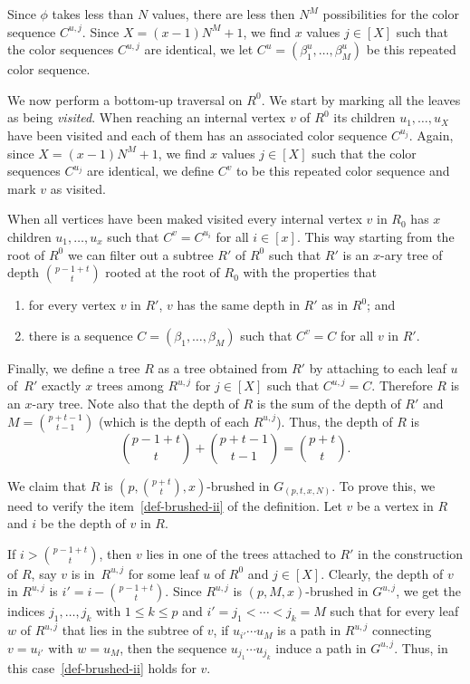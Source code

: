 Since $\phi$ takes less than $N$ values, there are less then $N^{M}$ possibilities for
the color sequence $C^{u,j}$.
Since $X = (x-1)N^{M}+1$, we find $x$ values $j\in [X]$ such that the
color sequences $C^{u,j}$ are identical, we let
$C^{u}=\left(\beta^u_1,\ldots,\beta^u_{M}\right)$ be this repeated color sequence.

We now perform a bottom-up traversal on  $R^{0}$.
We start by marking all the leaves as being \emph{visited}.
When reaching an internal vertex $v$ of $R^{0}$ its children
$u_1,\ldots,u_X$ have been visited and each of them has an
associated color sequence $C^{u_j}$. Again, since $X = (x-1)N^{M}+1$,
we find $x$ values $j\in [X]$ such that the
color sequences $C^{u_j}$ are identical, we define
$C^{v}$ to be this repeated color sequence and mark
$v$ as visited.

When all vertices have been maked visited every internal vertex $v$ in $R_0$
has $x$ children $u_1,\ldots,u_x$ such that $C^v=C^{u_i}$ for all $i\in[x]$.
This way starting from the root of $R^0$ we can filter out a subtree $R'$
of $R^0$ such that $R'$ is an $x$-ary tree of depth $\binom{p-1+t}{t}$
rooted at the root of $R_0$ with the properties that
\begin{enumerate}[label=\textup{(\roman*)},nosep]
\item for every vertex $v$ in $R'$, $v$ has the same depth in $R'$ as in $R^0$; and
\item there is a sequence $C=(\beta_1,\ldots,\beta_M)$ such that $C^v=C$ for all $v$ in $R'$.
\end{enumerate}

Finally, we define a tree $R$ as a tree obtained from $R'$ by attaching to
each leaf $u$ of~$R'$ exactly $x$ trees among $R^{u,j}$ for $j\in[X]$ such
that $C^{u,j}=C$.  Therefore $R$ is an $x$-ary tree.  Note also that the
depth of $R$ is the sum of the depth of $R'$ and $M=\binom{p+t-1}{t-1}$
(which is the depth of each $R^{u,j}$).  Thus, the depth of $R$ is
\[
\binom{p-1+t}{t} + \binom{p+t-1}{t-1} = \binom{p+t}{t}.
\]

We claim that $R$ is $\left(p,\binom{p+t}{t},x\right)$-brushed in $G_{(p,t,x,N)}$. 
To prove this, we need to verify the item~\eqref{def-brushed-ii} of the definition.
Let $v$ be a vertex in $R$ and $i$ be the depth of $v$ in $R$.

If $i> \binom{p-1+t}{t}$, then $v$ lies in one of the trees attached to $R'$
in the construction of $R$, say $v$ is in~$R^{u,j}$ for some leaf $u$ of
$R^0$ and $j\in[X]$.  Clearly, the depth of $v$ in $R^{u,j}$ is
$i'=i-\binom{p-1+t}{t}$.  Since $R^{u,j}$ is $(p,M,x)$-brushed in $G^{u,j}$,
we get the indices $j_1,\ldots,j_k$ with $1\leq k\leq p$ and
$i'=j_1 < \cdots < j_k = M$ such that for every leaf $w$ of $R^{u,j}$ that
lies in the subtree of $v$, if $u_{i'}\cdots u_M$ is a path in $R^{u,j}$
connecting $v=u_{i'}$ with $w=u_M$, then the sequence $u_{j_1}\cdots u_{j_k}$
induce a path in $G^{u,j}$.  Thus, in this case~\eqref{def-brushed-ii} holds
for $v$.


